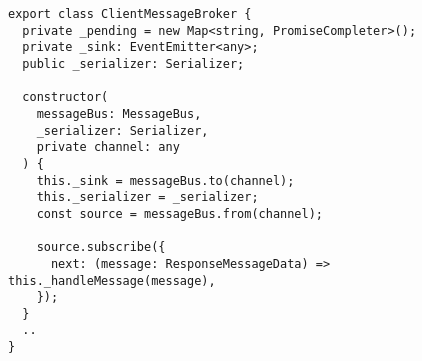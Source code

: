 \begin{verbatim}
export class ClientMessageBroker {
  private _pending = new Map<string, PromiseCompleter>();
  private _sink: EventEmitter<any>;
  public _serializer: Serializer;

  constructor(
    messageBus: MessageBus,
    _serializer: Serializer,
    private channel: any
  ) {
    this._sink = messageBus.to(channel);
    this._serializer = _serializer;
    const source = messageBus.from(channel);

    source.subscribe({
      next: (message: ResponseMessageData) => this._handleMessage(message),
    });
  }
  ..
}
\end{verbatim}
